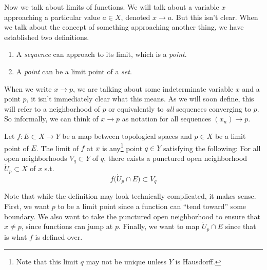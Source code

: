   Now we talk about limits of functions. We will talk about a variable $x$ approaching a particular value $a \in X$, denoted $x \to a$. But this isn't clear. When we talk about the concept of something approaching another thing, we have established two definitions. 
  \begin{enumerate}
    \item A \textit{sequence} can approach to its limit, which is a \textit{point}. 
    \item A \textit{point} can be a limit point of a \textit{set}. 
  \end{enumerate} 
  When we write $x \to p$, we are talking about some indeterminate variable $x$ and a point $p$, it isn't immediately clear what this means. As we will soon define, this will refer to a neighborhood of $p$ or equivalently to \textit{all} sequences converging to $p$. So informally, we can think of $x \to p$ as notation for all sequences $(x_n) \to p$.   

  \begin{definition}
    Let $f: E \subset X \to Y$ be a map between topological spaces and $p \in X$ be a limit point of $E$. The limit of $f$ at $x$ is any\footnote{Note that this limit $q$ may not be unique unless $Y$ is Hausdorff.} point $q \in Y$ satisfying the following: For all open neighborhoods $V_q \subset Y$ of $q$, there exists a punctured open neighborhood $\mathring{U}_p \subset X$ of $x$ s.t. 
    \begin{equation}
      f\big( \mathring{U}_p \cap E \big) \subset V_q
    \end{equation}
  \end{definition}

  Note that while the definition may look technically complicated, it makes sense. First, we want $p$ to be a limit point since a function can ``tend toward'' some boundary. We also want to take the punctured open neighborhood to ensure that $x \neq p$, since functions can jump at $p$. Finally, we want to map $\mathring{U}_p \cap E$ since that is what $f$ is defined over. 

